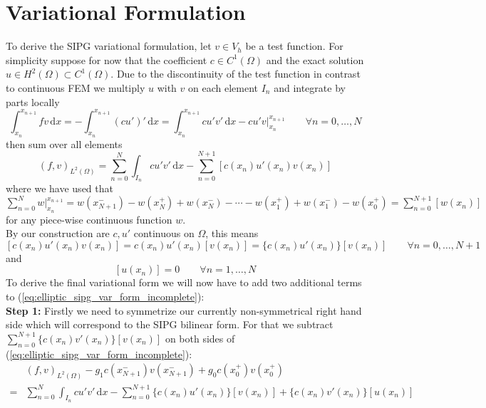 \section{Variational Formulation}
To derive the SIPG variational formulation, let $v \in V_h$ be a test
function. For simplicity suppose for now that the coefficient $c \in C^1(\Omega)$ and
the exact solution $u \in H^2(\Omega) \subset C^1(\Omega)$. 
Due to the discontinuity of the test function in contrast to 
continuous FEM we multiply $u$ with $v$ on each element $I_n$
and integrate by parts locally
\begin{equation*}
    \int_{x_n}^{x_{n+1}} fv\, \text{d}x = -\int_{x_n}^{x_{n+1}} (cu')'\, \text{d}x 
    = \int_{x_n}^{x_{n+1}} cu'v'\, \text{d}x 
    - \left. cu'v\right|_{x_n}^{x_{n+1}} \qquad \forall n=0,\ldots,N
\end{equation*}
then sum over all elements
\begin{equation}
    \label{eq:elliptic_sipg_var_form_incomplete}
    (f,v)_{L^2(\Omega)} = \sum_{n=0}^N \int_{I_n} cu'v'\, \text{d}x 
    -\sum_{n=0}^{N+1} [c(x_n)u'(x_n)v(x_n)]
\end{equation}
where we have used that $\sum_{n=0}^N \left. w \right|_{x_n}^{x_{n+1}} = w(x_{N+1}^-) - 
w(x_{N}^+) + w(x_{N}^-) - \cdots - w(x_1^+) + w(x_1^-) - w(x_0^+) = \sum_{n=0}^{N+1} [w(x_n)]$ for any piece-wise continuous function $w$.
\\
By our construction are $c, u'$ continuous on $\Omega$, this means 
\begin{equation}
    \label{eq:id_1_cu_jump_zero}
        [c(x_n)u'(x_n)v(x_n)] = c(x_n)u'(x_n)[v(x_n)] = \{c(x_n)u'(x_n)\}[v(x_n)] \qquad \forall n=0,\ldots,N+1
\end{equation}
and 
\begin{equation}
    \label{eq:id_2_u_jump_zero}
    [u(x_n)] = 0 \qquad \forall n=1,\ldots,N
\end{equation}
To derive the final variational form we will now have to add two additional terms
to (\ref{eq:elliptic_sipg_var_form_incomplete}): \\
\textbf{Step 1:} Firstly we need to symmetrize our currently non-symmetrical right hand side
which will correspond to the SIPG bilinear form.
For that we subtract $\sum_{n=0}^{N+1} \{c(x_n)v'(x_n)\}[v(x_n)]$ on both sides of
(\ref{eq:elliptic_sipg_var_form_incomplete}):
\begin{align*}
    &(f,v)_{L^2(\Omega)}-g_1c(x_{N+1}^-)v(x_{N+1}^-) + g_0c(x_0^+)v(x_0^+) \\
    = &\sum_{n=0}^N \int_{I_n} cu'v'\, \text{d}x 
    -\sum_{n=0}^{N+1} \{c(x_n)u'(x_n)\}[v(x_n)] + \{c(x_n)v'(x_n)\}[u(x_n)]
\end{align*}
